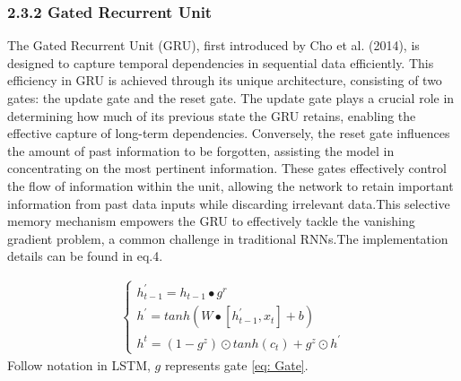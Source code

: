 \documentclass[10pt,letterpaper]{article}
\begin{document}
\subsubsection*{2.3.2 Gated Recurrent Unit}
 The Gated Recurrent Unit (GRU), first introduced by Cho et al. (2014), is designed to capture temporal dependencies in sequential data efficiently. This efficiency in GRU is achieved through its unique architecture, consisting of two gates: the update gate and the reset gate. The update gate plays a crucial role in determining how much of its previous state the GRU retains, enabling the effective capture of long-term dependencies. Conversely, the reset gate influences the amount of past information to be forgotten, assisting the model in concentrating on the most pertinent information. These gates effectively control the flow of information within the unit, allowing the network to retain important information from past data inputs while discarding irrelevant data.This selective memory mechanism empowers the GRU to effectively tackle the vanishing gradient problem, a common challenge in traditional RNNs.The implementation details can be found in eq.4.

\begin{eqnarray}
\label{eq: GRU}
    \begin {cases} h^{'}_{t - 1} = h_{t - 1}{\bullet}g^r
    \\h^{'} = tanh(W\bullet[h^{'}_{t - 1}, x_t] + b)
    \\h^t = (1 - g^z){\odot}tanh(c_t) + g^z{\odot}h^{'}
    \end {cases}
\end{eqnarray}
Follow notation in LSTM,  $g$ represents gate \ref{eq: Gate}.


\end{document}
